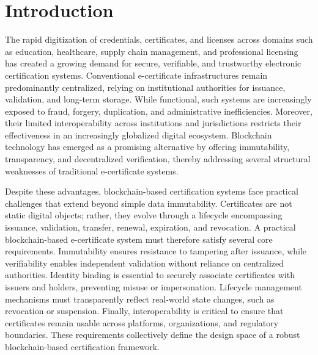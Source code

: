 \documentclass[pdflatex,sn-mathphys-num]{sn-jnl}
\begin{document}

\maketitle

\section{Introduction}
\label{sec:introduction}
The rapid digitization of credentials, certificates, and licenses across domains such as education, healthcare, supply chain management, and professional licensing has created a growing demand for secure, verifiable, and trustworthy electronic certification systems. Conventional e-certificate infrastructures remain predominantly centralized, relying on institutional authorities for issuance, validation, and long-term storage. While functional, such systems are increasingly exposed to fraud, forgery, duplication, and administrative inefficiencies. Moreover, their limited interoperability across institutions and jurisdictions restricts their effectiveness in an increasingly globalized digital ecosystem. Blockchain technology has emerged as a promising alternative by offering immutability, transparency, and decentralized verification, thereby addressing several structural weaknesses of traditional e-certificate systems.

Despite these advantages, blockchain-based certification systems face practical challenges that extend beyond simple data immutability. Certificates are not static digital objects; rather, they evolve through a lifecycle encompassing issuance, validation, transfer, renewal, expiration, and revocation. A practical blockchain-based e-certificate system must therefore satisfy several core requirements. Immutability ensures resistance to tampering after issuance, while verifiability enables independent validation without reliance on centralized authorities. Identity binding is essential to securely associate certificates with issuers and holders, preventing misuse or impersonation. Lifecycle management mechanisms must transparently reflect real-world state changes, such as revocation or suspension. Finally, interoperability is critical to ensure that certificates remain usable across platforms, organizations, and regulatory boundaries. These requirements collectively define the design space of a robust blockchain-based certification framework.
\end{document}
